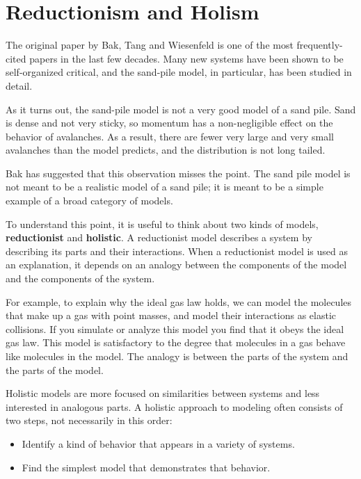 \documentclass[10pt]{book}
\begin{document}
\section{Reductionism and Holism}

The original paper by Bak, Tang and Wiesenfeld is one of
the most frequently-cited papers in the last few decades.
Many new systems have been shown to be self-organized critical,
and the sand-pile model, in particular, has been studied
in detail.

As it turns out, the sand-pile model is not a very good model
of a sand pile.  Sand is dense and not very sticky, so momentum
has a non-negligible effect on the behavior of avalanches.  As
a result, there are fewer very large and very small avalanches
than the model predicts, and the distribution is not long tailed.

Bak has suggested that this observation misses the point.
The sand pile model is not meant to be a realistic model of a sand
pile; it is meant to be a simple example of a broad category of
models.

To understand this point, it is useful to think about two
kinds of models, {\bf reductionist} and {\bf holistic}.  A
reductionist model describes a system by describing its parts
and their interactions.  When a reductionist model is used
as an explanation, it depends on an analogy between the 
components of the model and the components of the system.

For example, to explain why the ideal gas law holds, we can model the
molecules that make up a gas with point masses, and model their
interactions as elastic collisions.  If you simulate or analyze this
model you find that it obeys the ideal gas law.  This model is
satisfactory to the degree that molecules in a gas behave like
molecules in the model.  The analogy is between the parts of the
system and the parts of the model.

Holistic models are more focused on similarities between systems and
less interested in analogous parts.  A holistic approach to modeling
often consists of two steps, not necessarily in this order:

\begin{itemize}

\item Identify a kind of behavior that appears in a variety of
systems.

\item Find the simplest model that demonstrates that behavior.

\end{itemize}
\end{document}
